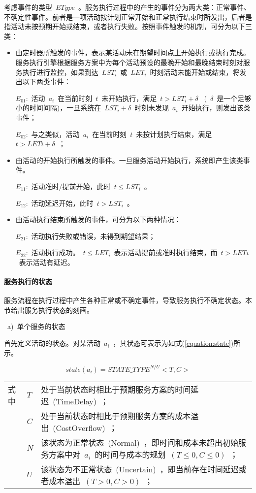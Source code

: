 考虑事件的类型~$EType$~。服务执行过程中的产生的事件分为两大类：正常事件、不确定性事件。前者是一项活动按计划正常开始和正常执行结束时所发出，后者是指活动未按预期开始或结束，或者执行失败。按照事件触发的机制，可分为以下三类：

\begin{itemize}
    \item 由定时器所触发的事件，表示某活动未在期望时间点上开始执行或执行完成。服务执行引擎根据服务方案中为每个活动预设的最晚开始和最晚结束时刻对服务执行进行监控，如果到达~$LST_i$~或~$LET_i$~时刻活动未能开始或结束，将发出以下两类事件：
    
    $E_{01}$:~活动~$a_i$~在当前时刻~$t$~未开始执行，满足~$t>LST_i+\delta$~ (~$\delta$~是一个足够小的时间间隔)，一旦系统在~$LST_i+\delta$~时刻未发现~$a_i$~开始执行，则发出该类事件；
    
    $E_{02}$:~与之类似，活动~$a_i$~在当前时刻~$t$~未按计划执行结束，满足~$t>LETi+\delta$~；
    
    \item 由活动的开始执行所触发的事件。一旦服务活动开始执行，系统即产生该类事件。
    
    $E_{11}$:~活动准时/提前开始，此时~$t\le LST_i$~。
    
    $E_{12}$:~活动延迟开始，此时~$t>LST_i$~。
    
    \item 由活动执行结束所触发的事件，可分为以下两种情况：
    
    $E_{21}$:~活动执行失败或错误，未得到期望结果；
    
    $E_{22}$:~活动执行成功。~$t\le LET_i$~表示活动提前或准时执行结束，而~$t>LETi$~表示活动有延迟。
    
\end{itemize}

\paragraph{服务执行的状态} 

服务流程在执行过程中产生各种正常或不确定事件，导致服务执行不确定状态。本节给出服务执行状态的刻画。

~a)~单个服务的状态

首先定义活动的状态。对某活动~$a_i$~，其状态可表示为如式(\ref{equation:state})所示。

\begin{equation}\label{equation:state}
state(a_i)=STATE\_TYPE^{N/U}<T, C>
\end{equation}
\begin{tabularx}{\textwidth}{@{}l@{\quad}l@{\pozhehao }X@{}}
    式中
    & $T$ & 处于当前状态时相比于预期服务方案的时间延迟~(TimeDelay)~；\\
    & $C$ & 处于当前状态时相比于预期服务方案的成本溢出~(CostOverflow)~；\\
    & $N$ & 该状态为正常状态~(Normal)~，即时间和成本未超出初始服务方案中对~$a_i$~的时间与成本的规划~$(T\le 0, C\le 0)$~；\\
    & $U$ & 该状态为不正常状态~(Uncertain)~，即当前存在时间延迟或者成本溢出~$(T>0, C>0)$~；
\end{tabularx}\vspace{\wordsep}

